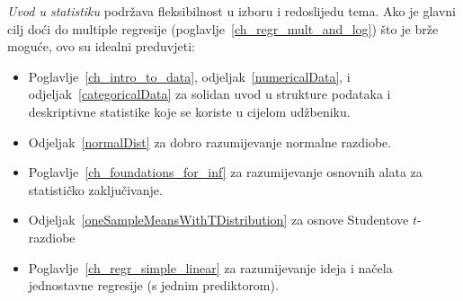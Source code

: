 \noindent%
\emph{Uvod u statistiku} podržava fleksibilnost
u izboru i redoslijedu tema.
Ako je glavni cilj doći do multiple regresije
(poglavlje~\ref{ch_regr_mult_and_log})
što je brže moguće, ovo su idealni preduvjeti:
\begin{itemize}
	\setlength{\itemsep}{0mm}
	\item Poglavlje~\ref{ch_intro_to_data},
	odjeljak~\ref{numericalData},
	i odjeljak~\ref{categoricalData} za solidan
	uvod u strukture podataka i deskriptivne statistike
	koje se koriste u cijelom udžbeniku.
	\item Odjeljak~\ref{normalDist}
	za dobro razumijevanje normalne razdiobe.
	\item Poglavlje~\ref{ch_foundations_for_inf}
	za razumijevanje osnovnih alata za statističko zaključivanje.
	\item Odjeljak~\ref{oneSampleMeansWithTDistribution}
	za osnove Studentove $t$-razdiobe
	\item Poglavlje~\ref{ch_regr_simple_linear}
	za razumijevanje ideja i načela jednostavne regresije
	(s jednim prediktorom).
\end{itemize}%

